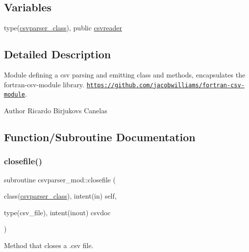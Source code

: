 \subsection*{Variables}
\begin{DoxyCompactItemize}
\item 
type(\mbox{\hyperlink{structcsvparser__mod_1_1csvparser__class}{csvparser\+\_\+class}}), public \mbox{\hyperlink{namespacecsvparser__mod_ab6217ec53c20650314f678ba29d4c105}{csvreader}}
\end{DoxyCompactItemize}


\subsection{Detailed Description}
Module defining a csv parsing and emitting class and methods, encapsulates the fortran-\/csv-\/module library. \href{https://github.com/jacobwilliams/fortran-csv-module}{\tt https\+://github.\+com/jacobwilliams/fortran-\/csv-\/module}. 

\begin{DoxyAuthor}{Author}
Ricardo Birjukovs Canelas 
\end{DoxyAuthor}


\subsection{Function/\+Subroutine Documentation}
\mbox{\label{namespacecsvparser__mod_a8f56a69c948d139a3e9c88476f25305d}} 
\subsubsection{\texorpdfstring{closefile()}{closefile()}}
{\footnotesize\ttfamily subroutine csvparser\+\_\+mod\+::closefile (\begin{DoxyParamCaption}\item[{class(\mbox{\hyperlink{structcsvparser__mod_1_1csvparser__class}{csvparser\+\_\+class}}), intent(in)}]{self,  }\item[{type(csv\+\_\+file), intent(inout)}]{csvdoc }\end{DoxyParamCaption})\hspace{0.3cm}{\ttfamily [private]}}



Method that closes a .csv file. 

